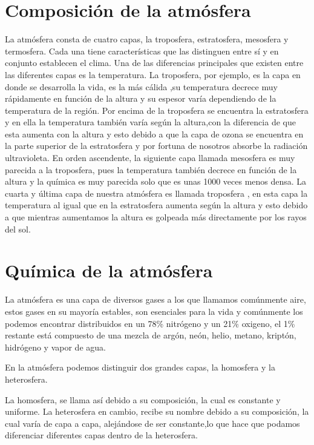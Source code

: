 \documentclass[11pt]{article}
\begin{document}
\section*{Composición de la atmósfera}

La atmósfera consta de cuatro capas, la troposfera, estratosfera, mesosfera y termosfera. Cada una tiene características que las distinguen entre sí y en conjunto establecen el clima.
Una de las diferencias principales que existen entre las diferentes capas es la temperatura. La troposfera, por ejemplo, es la capa en donde se desarrolla la vida, es la más cálida ,su temperatura decrece muy rápidamente en función de la altura y su espesor varía dependiendo de la temperatura de la región. Por encima de la troposfera se encuentra la estratosfera y en ella la temperatura también varía según la altura,con la diferencia de que esta aumenta con la altura y esto debido a que la capa de ozona se encuentra en la parte superior de la estratosfera y por fortuna de nosotros absorbe la radiación ultravioleta. En orden ascendente, la siguiente capa llamada mesosfera es muy parecida a la troposfera, pues la temperatura también decrece en función de la altura y la química es muy parecida solo que es unas 1000 veces menos densa. La cuarta y última capa de nuestra atmósfera es llamada troposfera , en esta capa la temperatura al igual que en la estratosfera aumenta según la altura y esto debido a que mientras aumentamos la altura es golpeada más directamente por los rayos del sol.


\section*{Química de la atmósfera}
La atmósfera es una capa de diversos gases a los que llamamos comúnmente aire, estos gases en su mayoría estables, son esenciales para la vida y comúnmente los podemos encontrar distribuidos en un 78\% nitrógeno y un 21\% oxigeno, el 1\% restante está compuesto de una mezcla de argón, neón, helio, metano, kriptón, hidrógeno y vapor de agua.

En la atmósfera podemos distinguir dos grandes capas, la homosfera y la heterosfera.

La homosfera, se llama así debido a su composición, la cual es constante y uniforme. La heterosfera en cambio, recibe su nombre debido a su composición, la cual varía de capa a capa, alejándose de ser constante,lo que hace que podamos diferenciar diferentes capas dentro de la heterosfera.
\end{document}
